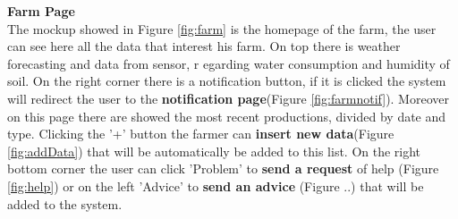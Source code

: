 \textbf{Farm Page}\\ 
The mockup showed in Figure \ref{fig:farm} is the homepage of the farm, the user can see here all the data that interest his farm. On top there is weather forecasting and data from sensor, r
egarding water consumption and humidity of soil. On the right corner there is a notification button, if it is clicked the system will redirect the user to the \textbf{notification page}(Figure \ref{fig:farmnotif}).
Moreover on this page there are showed the most recent productions, divided by date and type. Clicking the '+' button the farmer can \textbf{insert new data}(Figure \ref{fig:addData}) that will be automatically be added to this list.
On the right bottom corner the user can click 'Problem' to \textbf{send a request} of help (Figure \ref{fig:help}) or on the left 'Advice' to \textbf{send an advice} (Figure ..) that will be added to the system.

